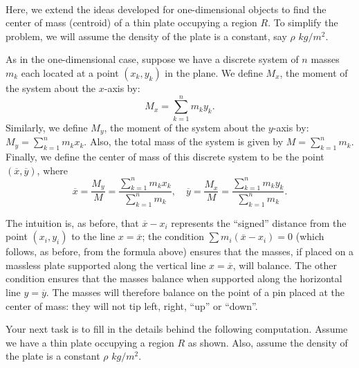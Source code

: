\documentclass[12pt,reqno]{amsart}
\numberwithin{equation}{section} \theoremstyle{plain}
\begin{document}
\\
Here, we extend the ideas developed for one-dimensional objects to find the center of mass (centroid) of 
a thin plate occupying a   region $R$. To simplify the problem, we will assume the density of the 
plate is a constant, say $\rho$ $kg/m^2$. 

As in the one-dimensional case, suppose we have a discrete system of $n$ masses $m_k$ each located at a point 
$(x_k, y_k)$ in the plane. We define $M_x$, the moment of the system about the $x$-axis by:
$$M_x=\sum_{k=1}^n m_k y_k.$$
Similarly, we define $M_y$, the moment of the system about the $y$-axis by:
$M_y=\sum_{k=1}^n m_k x_k$. Also,  the total mass of the system is given by $M=\sum_{k=1}^n m_k $. 
Finally, we define the center of mass of this discrete system to be the point $(\overline{x}, \overline{y})$, where
$$\overline{x}= \frac{M_y}{M}= \frac{\sum_{k=1}^n m_k x_k}{\sum_{k=1}^n m_k},\quad \overline{y}= 
\frac{M_x}{M}= \frac{\sum_{k=1}^n m_k y_k}{\sum_{k=1}^n m_k}.$$

The intuition is, as before, that $\overline{x}-x_i$ represents the ``signed'' distance 
from the point $(x_i,y_i)$
to the line $x=\overline{x}$; the condition $\sum m_i(\overline{x}-x_i)=0$ 
(which follows, as before, from the formula above) ensures
that the masses, if placed on a massless plate supported along the vertical line 
$x=\overline{x}$, will balance. The other condition ensures that the masses 
balance when supported along the horizontal line $y=\overline{y}$. The masses will
therefore balance on the point of a pin placed at the center of mass: they will not
tip left, right, ``up'' or ``down''.

\smallskip

 Your next task is to fill in the details behind the following computation.
Assume we have a thin plate occupying a region $R$ as shown. Also, 
assume the density of the plate is a constant $\rho$ $kg/m^2$.  




\leavevmode

\epsfxsize=1.8in
\centerline{}
\end{document}
